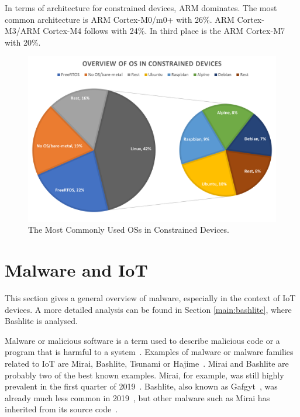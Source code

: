 In terms of architecture for constrained devices, ARM dominates. The most common architecture is ARM Cortex-M0/m0+ with 26\%. ARM Cortex-M3/ARM Cortex-M4 follows with 24\%. In third place is the ARM Cortex-M7 with 20\%.  




\begin{figure}[tph]
\includegraphics[scale=0.55]{assets/IoTOS.png}
\centering
\caption{The Most Commonly Used OSs in Constrained Devices.}
    \label{graphic:IoTOSs}
\end{figure}





\section{Malware and IoT} \label{section:MalwareAndIoT}
This section gives a general overview of malware, especially in the context of IoT devices. A more detailed analysis can be found in Section \ref{main:bashlite}, where Bashlite is analysed.

Malware or malicious software is a term used to describe malicious code or a program that is harmful to a system~\cite{website:malwarebytes}. Examples of malware or malware families related to IoT are Mirai, Bashlite, Tsunami or Hajime~\cite{article:surveyIoTmalware}. Mirai and Bashlite are probably two of the best known examples. Mirai, for example, was still highly prevalent in the first quarter of 2019~\cite{website:KasperskyAMalwareStory}. Bashlite, also known as Gafgyt~\cite{website:TrendMicroBashlite}, was already much less common in 2019~\cite{website:KasperskyAMalwareStory}, but other malware such as Mirai has inherited 
 from its source code~\cite{article:surveyIoTmalware}.

